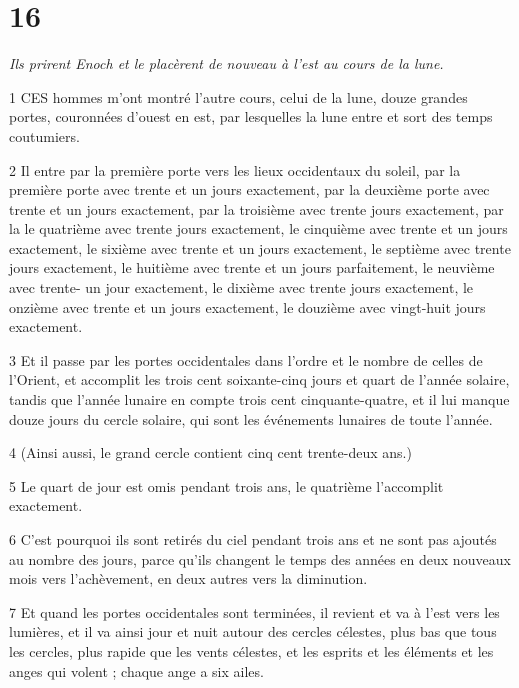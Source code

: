 \chapter{16}

\par \textit{Ils prirent Enoch et le placèrent de nouveau à l'est au cours de la lune.}

\par 1 CES hommes m'ont montré l'autre cours, celui de la lune, douze grandes portes, couronnées d'ouest en est, par lesquelles la lune entre et sort des temps coutumiers.

\par 2 Il entre par la première porte vers les lieux occidentaux du soleil, par la première porte avec trente et un jours exactement, par la deuxième porte avec trente et un jours exactement, par la troisième avec trente jours exactement, par la le quatrième avec trente jours exactement, le cinquième avec trente et un jours exactement, le sixième avec trente et un jours exactement, le septième avec trente jours exactement, le huitième avec trente et un jours parfaitement, le neuvième avec trente- un jour exactement, le dixième avec trente jours exactement, le onzième avec trente et un jours exactement, le douzième avec vingt-huit jours exactement.

\par 3 Et il passe par les portes occidentales dans l'ordre et le nombre de celles de l'Orient, et accomplit les trois cent soixante-cinq jours et quart de l'année solaire, tandis que l'année lunaire en compte trois cent cinquante-quatre, et il lui manque douze jours du cercle solaire, qui sont les événements lunaires de toute l'année.

\par 4 (Ainsi aussi, le grand cercle contient cinq cent trente-deux ans.)

\par 5 Le quart de jour est omis pendant trois ans, le quatrième l'accomplit exactement.

\par 6 C'est pourquoi ils sont retirés du ciel pendant trois ans et ne sont pas ajoutés au nombre des jours, parce qu'ils changent le temps des années en deux nouveaux mois vers l'achèvement, en deux autres vers la diminution.

\par 7 Et quand les portes occidentales sont terminées, il revient et va à l'est vers les lumières, et il va ainsi jour et nuit autour des cercles célestes, plus bas que tous les cercles, plus rapide que les vents célestes, et les esprits et les éléments et les anges qui volent ; chaque ange a six ailes.

